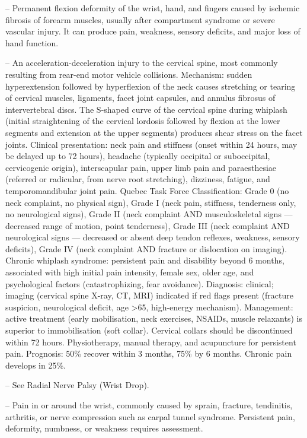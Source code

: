 -- Permanent flexion deformity of the wrist, hand, and fingers caused by ischemic fibrosis of forearm muscles, usually after compartment syndrome or severe vascular injury. It can produce pain, weakness, sensory deficits, and major loss of hand function.

-- An acceleration-deceleration injury to the cervical spine, most commonly resulting from rear-end motor vehicle collisions. Mechanism: sudden hyperextension followed by hyperflexion of the neck causes stretching or tearing of cervical muscles, ligaments, facet joint capsules, and annulus fibrosus of intervertebral discs. The S-shaped curve of the cervical spine during whiplash (initial straightening of the cervical lordosis followed by flexion at the lower segments and extension at the upper segments) produces shear stress on the facet joints. Clinical presentation: neck pain and stiffness (onset within 24 hours, may be delayed up to 72 hours), headache (typically occipital or suboccipital, cervicogenic origin), interscapular pain, upper limb pain and paraesthesiae (referred or radicular, from nerve root stretching), dizziness, fatigue, and temporomandibular joint pain. Quebec Task Force Classification: Grade 0 (no neck complaint, no physical sign), Grade I (neck pain, stiffness, tenderness only, no neurological signs), Grade II (neck complaint AND musculoskeletal signs — decreased range of motion, point tenderness), Grade III (neck complaint AND neurological signs — decreased or absent deep tendon reflexes, weakness, sensory deficits), Grade IV (neck complaint AND fracture or dislocation on imaging). Chronic whiplash syndrome: persistent pain and disability beyond 6 months, associated with high initial pain intensity, female sex, older age, and psychological factors (catastrophizing, fear avoidance). Diagnosis: clinical; imaging (cervical spine X-ray, CT, MRI) indicated if red flags present (fracture suspicion, neurological deficit, age >65, high-energy mechanism). Management: active treatment (early mobilisation, neck exercises, NSAIDs, muscle relaxants) is superior to immobilisation (soft collar). Cervical collars should be discontinued within 72 hours. Physiotherapy, manual therapy, and acupuncture for persistent pain. Prognosis: 50\% recover within 3 months, 75\% by 6 months. Chronic pain develops in 25\%.

-- See Radial Nerve Palsy (Wrist Drop).

-- Pain in or around the wrist, commonly caused by sprain, fracture, tendinitis, arthritis, or nerve compression such as carpal tunnel syndrome. Persistent pain, deformity, numbness, or weakness requires assessment.
